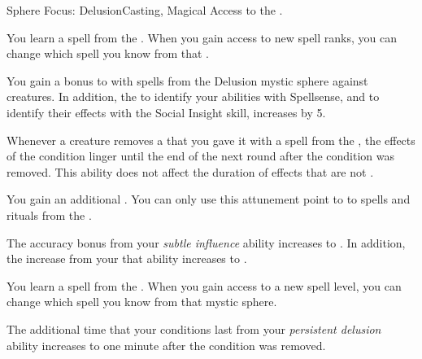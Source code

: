     \begin{feat}{Sphere Focus: Delusion}{Casting, Magical}
        \featpre Access to the  .

         You learn a spell from the  .
        When you gain access to new spell ranks, you can change which spell you know from that .

         You gain a  bonus to  with spells from the Delusion mystic sphere against  creatures.
        In addition, the  to identify your  abilities with Spellsense, and to identify their effects with the Social Insight skill, increases by 5.

         Whenever a creature removes a  that you gave it with a spell from the  , the effects of the condition linger until the end of the next round after the condition was removed.
        This ability does not affect the duration of effects that are not .  

         You gain an additional .
        You can only use this attunement point to  to spells and rituals from the  .

         The accuracy bonus from your \textit{subtle influence} ability increases to .
        In addition, the  increase from your that ability increases to .

         You learn a spell from the  .
        When you gain access to a new spell level, you can change which spell you know from that mystic sphere.

         The additional time that your conditions last from your \textit{persistent delusion} ability increases to one minute after the condition was removed.
    \end{feat}

